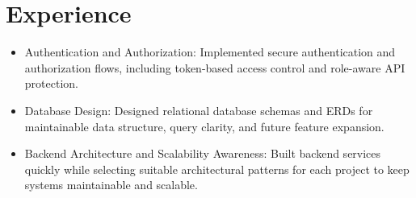 \section{Experience}
\begin{itemize}
  \item Authentication and Authorization: Implemented secure authentication and authorization flows, including token-based access control and role-aware API protection.
  \item Database Design: Designed relational database schemas and ERDs for maintainable data structure, query clarity, and future feature expansion.
  \item Backend Architecture and Scalability Awareness: Built backend services quickly while selecting suitable architectural patterns for each project to keep systems maintainable and scalable.
\end{itemize}
